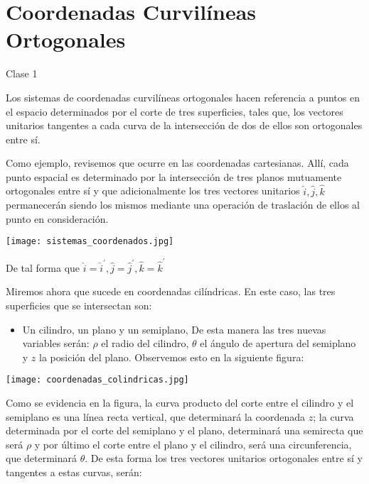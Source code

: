 \chapter{Coordenadas Curvilíneas Ortogonales }

Clase 1

Los sistemas de coordenadas curvilíneas ortogonales hacen referencia a puntos en el espacio determinados por el corte de tres superficies, tales que, los vectores unitarios tangentes a cada curva de la intersección de dos de ellos son ortogonales entre sí.

Como ejemplo, revisemos que ocurre en las coordenadas cartesianas. Allí, cada punto espacial es determinado por la intersección de tres planos mutuamente ortogonales entre sí y que adicionalmente los tres vectores unitarios $\hat{i}, \hat{j}, \hat{k}$ permanecerán siendo los mismos mediante una operación de traslación de ellos al punto en consideración.

\begin{center}
  \texttt{[image: sistemas\_coordenados.jpg]}
\end{center}

De tal forma que $\hat{i}=\hat{i}^{\prime}, \hat{j}=\hat{j}^{\prime}, \hat{k}=\hat{k}^{\prime}$

Miremos ahora que sucede en coordenadas cilíndricas. En este caso, las tres superficies que se intersectan son:

\begin{itemize}
  \item Un cilindro, un plano y un semiplano, De esta manera las tres nuevas variables serán: $\rho$ el radio del cilindro, $\theta$ el ángulo de apertura del semiplano y $z$ la posición del plano. Observemos esto en la siguiente figura:
\end{itemize}

\begin{center}
\texttt{[image: coordenadas\_colindricas.jpg]}
\end{center}

Como se evidencia en la figura, la curva producto del corte entre el cilindro y el semiplano es una línea recta vertical, que determinará la coordenada $z$; la curva determinada por el corte del semiplano y el plano, determinará una semirecta que será $\rho$ y por último el corte entre el plano y el cilindro, será una circunferencia, que determinará $\theta$. De esta forma los tres vectores unitarios ortogonales entre sí y tangentes a estas curvas, serán:

